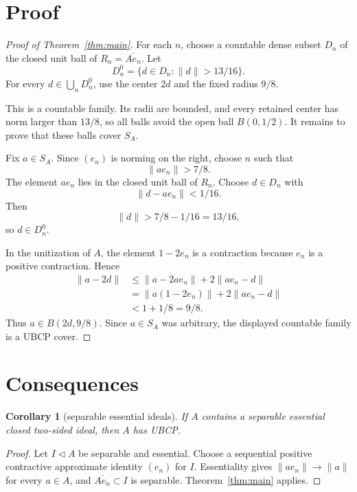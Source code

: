 \documentclass[11pt]{article}
\newtheorem{corollary}{Corollary}
\newcommand{\cl}{\overline}
\begin{document}
\section*{Proof}

\begin{proof}[Proof of Theorem~\ref{thm:main}]
For each \(n\), choose a countable dense subset \(D_n\) of the closed unit
ball of \(R_n=\cl{Ae_n}\).  Let
\[
        D_n^0=\{d\in D_n:\|d\|>13/16\}.
\]
For every \(d\in \bigcup_n D_n^0\), use the center \(2d\) and the fixed
radius \(9/8\).

This is a countable family.  Its radii are bounded, and every retained center
has norm larger than \(13/8\), so all balls avoid the open ball \(B(0,1/2)\).
It remains to prove that these balls cover \(S_A\).

Fix \(a\in S_A\).  Since \((e_n)\) is norming on the right, choose \(n\) such
that
\[
        \|ae_n\|>7/8.
\]
The element \(ae_n\) lies in the closed unit ball of \(R_n\).  Choose
\(d\in D_n\) with
\[
        \|d-ae_n\|<1/16.
\]
Then
\[
        \|d\|>7/8-1/16=13/16,
\]
so \(d\in D_n^0\).

In the unitization of \(A\), the element \(1-2e_n\) is a contraction because
\(e_n\) is a positive contraction.  Hence
\[
\begin{aligned}
        \|a-2d\|
        &\le \|a-2ae_n\|+2\|ae_n-d\|\\
        &=   \|a(1-2e_n)\|+2\|ae_n-d\|\\
        &<  1+1/8
        =   9/8.
\end{aligned}
\]
Thus \(a\in B(2d,9/8)\).  Since \(a\in S_A\) was arbitrary, the displayed
countable family is a UBCP cover.
\end{proof}

\section*{Consequences}

\begin{corollary}[separable essential ideals]
If \(A\) contains a separable essential closed two-sided ideal, then \(A\)
has UBCP.
\end{corollary}

\begin{proof}
Let \(I\triangleleft A\) be separable and essential.  Choose a sequential
positive contractive approximate identity \((e_n)\) for \(I\).  Essentiality
gives \(\|ae_n\|\to\|a\|\) for every \(a\in A\), and
\(\cl{Ae_n}\subset I\) is separable.  Theorem~\ref{thm:main} applies.
\end{proof}
\end{document}
